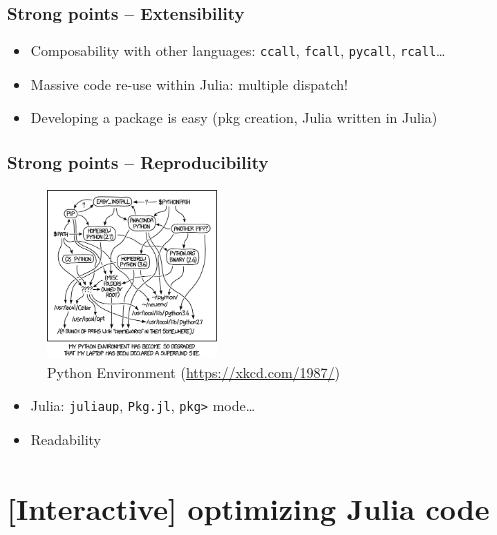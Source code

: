 \documentclass{beamer}
\begin{document}
\begin{frame}
    \frametitle{Strong points -- Extensibility}
    \begin{itemize}
        \item Composability with other languages: {\tt ccall}, {\tt fcall}, {\tt pycall}, {\tt rcall}\dots
        \item Massive code re-use within Julia: multiple dispatch!
        \item Developing a package is easy (pkg creation, Julia written in Julia)
    \end{itemize}
\end{frame}

\begin{frame}
    \frametitle{Strong points -- Reproducibility}
    \begin{figure}[htbp]
        \centering
        \includegraphics[width=0.4\textwidth]{python_environment.png}
        \caption{Python Environment (\url{https://xkcd.com/1987/})}
        \label{fig:xkcd_py_env}
    \end{figure}
    \pause
    \begin{itemize}
        \item Julia: {\tt juliaup}, {\tt Pkg.jl}, {\tt pkg>} mode\dots
        \item Readability
    \end{itemize}
\end{frame}

\section{[Interactive] optimizing Julia code}
\end{document}
